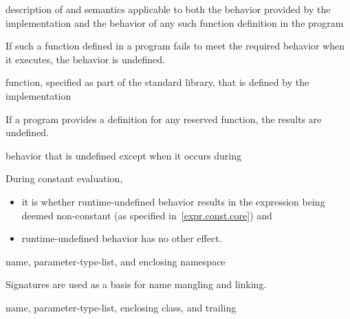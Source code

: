%
description of 
and  semantics
applicable to both the behavior provided by the implementation and
the behavior of any such function definition in the program

\begin{defnote}
If such a function defined in a \Cpp{} program fails to meet the required
behavior when it executes, the behavior is undefined.%
\end{defnote}

%
function, specified as part of the \Cpp{} standard library, that is defined by the
implementation

\begin{defnote}
If a \Cpp{} program provides a definition for any reserved function, the results are undefined.%
\end{defnote}

%
behavior that is undefined except when it occurs during 

\begin{defnote}
During constant evaluation,
\begin{itemize}
\item
it is
whether runtime-undefined behavior results in the expression being deemed non-constant
(as specified in~\ref{expr.const.core}) and
\item
runtime-undefined behavior has no other effect.
\end{itemize}
\end{defnote}

%
name,
parameter-type-list,
and enclosing namespace

\begin{defnote}
Signatures are used as a basis for
name mangling and linking.
\end{defnote}

%
name,
parameter-type-list,
enclosing class,
and
trailing 

